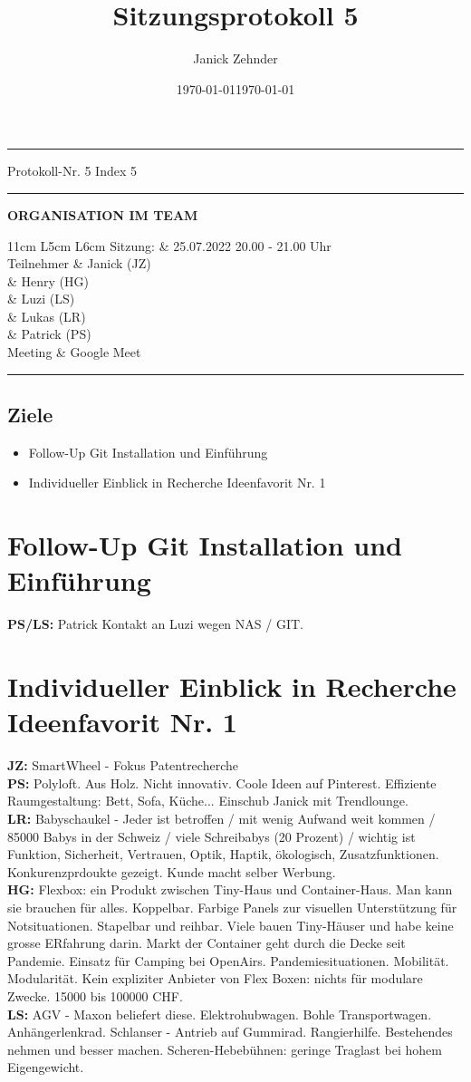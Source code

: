 \documentclass[10pt]{extarticle}
\date{}
\date{\today}
\makeatletter
\renewenvironment{abstract}
 {\par\noindent\ignorespaces}
 {\par\medskip}
\renewcommand{\maketitle}{\setlength{\parindent}{0pt}
\begin{flushleft}
  \huge\@title
  \par\vspace{1cm}
  \normalsize\@author
  \vspace{1cm}  
  
  \hrule
  \begin{minipage}[t]{\textwidth}
    \begin{minipage}[t]{0.25\textwidth}
    \vspace{0.3cm}
	Protokoll-Nr. 5 
	Index 5
    \vspace{0.3cm}
	\hrule
	\vspace{0.3cm}
	\date{\today}
	\vspace{0.3cm}
	\end{minipage}
	\begin{minipage}[t]{0.05\textwidth}
	 \hfill
	\end{minipage}
	\begin{minipage}[t]{0.70\textwidth}
	\begin{flushleft}    
	\vspace{0.3cm}
	\textbf{ORGANISATION IM TEAM}
	\vspace{0.3cm}
	
\begin{tabularx}{11cm} { 
   L{5cm}
   L{6cm}
  }
 \toprule
 Sitzung: & 25.07.2022 20.00 - 21.00 Uhr\\
 Teilnehmer & Janick (JZ) \\
 			& Henry (HG) \\
 			& Luzi (LS) \\
 			& Lukas (LR) \\
            & Patrick (PS)\\
 Meeting & Google Meet \\
 \end{tabularx}	
\begin{abstract}
\end{abstract}
\end{flushleft}
    \vspace{0.3cm}
	\end{minipage}
  \end{minipage}
  
  \hrule
\end{flushleft}
\vspace{1cm}

}
\makeatother
\begin{document}
\title{Sitzungsprotokoll 5}
\author{Janick Zehnder}
\maketitle


\colorbox{light-gray}{\begin{minipage}{17cm}
\vspace{0.25cm}
\section*{Ziele}
\begin{itemize}
\item Follow-Up Git Installation und Einführung
\item Individueller Einblick in Recherche Ideenfavorit Nr. 1
\end{itemize}
\vspace{0.25cm}
\end{minipage}}



\section{Follow-Up Git Installation und Einführung}
\textbf{PS/LS:} Patrick Kontakt an Luzi wegen NAS / GIT.\\

\section{Individueller Einblick in Recherche Ideenfavorit Nr. 1}
\textbf{JZ:} SmartWheel - Fokus Patentrecherche\\
\textbf{PS:} Polyloft. Aus Holz. Nicht innovativ. Coole Ideen auf Pinterest. Effiziente Raumgestaltung: Bett, Sofa, Küche... Einschub Janick mit Trendlounge.\\
\textbf{LR:} Babyschaukel - Jeder ist betroffen / mit wenig Aufwand weit kommen / 85000 Babys in der Schweiz / viele Schreibabys (20 Prozent) / wichtig ist Funktion, Sicherheit, Vertrauen, Optik, Haptik, ökologisch, Zusatzfunktionen. Konkurenzprdoukte gezeigt. Kunde macht selber Werbung.\\
\textbf{HG:} Flexbox: ein Produkt zwischen Tiny-Haus und Container-Haus. Man kann sie brauchen für alles. Koppelbar. Farbige Panels zur visuellen Unterstützung für Notsituationen. Stapelbar und reihbar. Viele bauen Tiny-Häuser und habe keine grosse ERfahrung darin. Markt der Container geht durch die Decke seit Pandemie. Einsatz für Camping bei OpenAirs. Pandemiesituationen. Mobilität. Modularität. Kein expliziter Anbieter von Flex Boxen: nichts für modulare Zwecke. 15000 bis 100000 CHF.\\
\textbf{LS:} AGV - Maxon beliefert diese. Elektrohubwagen. Bohle Transportwagen. Anhängerlenkrad. Schlanser - Antrieb auf Gummirad. Rangierhilfe. Bestehendes nehmen und besser machen. Scheren-Hebebühnen: geringe Traglast bei hohem Eigengewicht.\\
\end{document}
